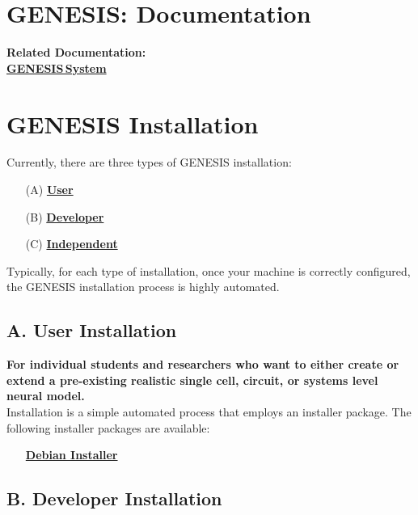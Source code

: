 \documentclass[12pt]{article}
\begin{document}
\section*{GENESIS: Documentation}

{\bf Related Documentation:} \\
\href{../genesis-system/genesis-system.tex}{\bf GENESIS\,System}

\section*{GENESIS  Installation}

Currently, there are three types of GENESIS installation:
\begin{itemize}
   \item[(A)]\href{../installation-debian/installation-debian.tex}{\bf User}
   \item[(B)]\href{../installation-developer/installation-developer.tex}{\bf Developer}
   \item[(C)]\href{../installation-independent/installation-independent.tex}{\bf Independent}
\end{itemize}
Typically, for each type of installation, once your machine is correctly configured,
the GENESIS installation process is highly automated.

\subsection*{A. User Installation}

{\bf For individual students and researchers who want to either create or extend a pre-existing realistic single cell, circuit, or systems level neural model.} \\
Installation is a simple automated process that employs an installer package. The following installer packages are available:
\begin{itemize}
   \item[] \href{../installation-debian/installation-debian.tex}{\bf Debian Installer}
\end{itemize}
   
\subsection*{B. Developer Installation}
\end{document}
